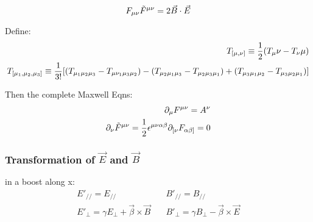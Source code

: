 \[
    F_{\mu\nu}\tilde{F}^{\mu\nu} = 2\vec{B}\cdot\vec{E}
\]

Define: 
\begin{equation}
    \begin{aligned}
    T_{[\mu, \nu]}  \equiv \frac{1}{2} (T_\mu\nu - T_\nu\mu)	\\
    T_{[\mu_1, \mu_2, \mu_3]} \equiv \frac{1}{3!} [(T_{\mu_1\mu_2\mu_3} - T_{\mu\nu_1\mu_3\mu_2})
    - (T_{\mu_2\mu_1\mu_3} - T_{\mu_2\mu_3\mu_1})
    + (T_{\mu_3\mu_1\mu_2} - T_{\mu_3\mu_2\mu_1})]
    \end{aligned}
\end{equation}

Then the complete Maxwell Eqns:
\begin{equation}
    \begin{aligned}
	\partial_\mu F^{\mu\nu} = A^{\nu}    \\
    \partial_\nu\tilde{F}^{\mu\nu} = \frac{1}{2}\epsilon^{\mu\nu\alpha\beta}\partial_{[\nu}F_{\alpha\beta]} = 0
    \end{aligned}
\end{equation}

\subsubsection{Transformation of $\vec{E}$ and $\vec{B}$}
in a boost along x:
\begin{equation}
    \begin{aligned}
	E'_{//} = E_{//}    \\
	E'_{\perp} = \gamma{E_{\perp} + \vec{\beta}\times\vec{B}}
    \end{aligned}
    \quad
    \begin{aligned}
	B'_{//} = B_{//}    \\
	B'_{\perp} = \gamma{B_{\perp} - \vec{\beta}\times\vec{E}}
    \end{aligned}
\end{equation}
